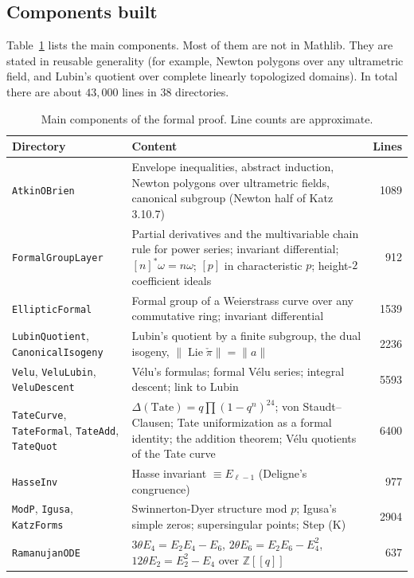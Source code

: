 \documentclass[11pt]{amsart}
\newcommand{\Z}{\mathbb{Z}}
\DeclareMathOperator{\Lie}{Lie}
\newcommand{\lean}[1]{\texttt{#1}}
\theoremstyle{plain}
\theoremstyle{definition}
\numberwithin{equation}{section}
\begin{document}
\subsection{Components built}
Table~\ref{tab:lean} lists the main components. Most of them are not in Mathlib. They are stated in reusable generality
(for example, Newton polygons over any ultrametric field, and Lubin's quotient over complete linearly topologized domains).
In total there are about $43{,}000$ lines in $38$ directories.

\begin{table}[ht]
\centering\small
\caption{Main components of the formal proof. Line counts are approximate.}\label{tab:lean}
\begin{tabular}{@{}p{}p{}r@{}}
\toprule
Directory & Content & Lines\\
\midrule
\lean{AtkinOBrien} & Envelope inequalities, abstract induction, Newton polygons over ultrametric fields, canonical subgroup (Newton half of Katz 3.10.7) & 1089\\
\lean{FormalGroupLayer} & Partial derivatives and the multivariable chain rule for power series; invariant differential; $[n]^*\omega=n\omega$; $[p]$ in characteristic $p$; height-$2$ coefficient ideals & 912\\
\lean{EllipticFormal} & Formal group of a Weierstrass curve over any commutative ring; invariant differential & 1539\\
\lean{LubinQuotient}, \lean{CanonicalIsogeny} & Lubin's quotient by a finite subgroup, the dual isogeny, $\|\Lie\check\pi\|=\|a\|$ & 2236\\
\lean{Velu}, \lean{VeluLubin}, \lean{VeluDescent} & V\'elu's formulas; formal V\'elu series; integral descent; link to Lubin & 5593\\
\lean{TateCurve}, \lean{TateFormal}, \lean{TateAdd}, \lean{TateQuot} & $\Delta(\mathrm{Tate})=q\prod(1-q^n)^{24}$; von Staudt--Clausen; Tate uniformization as a formal identity; the addition theorem; V\'elu quotients of the Tate curve & 6400\\
\lean{HasseInv} & Hasse invariant $\equiv E_{\ell-1}$ (Deligne's congruence) & 977\\
\lean{ModP}, \lean{Igusa}, \lean{KatzForms} & Swinnerton-Dyer structure mod $p$; Igusa's simple zeros; supersingular points; Step (K) & 2904\\
\lean{RamanujanODE} & $3\theta E_4=E_2E_4-E_6$, $2\theta E_6=E_2E_6-E_4^2$, $12\theta E_2=E_2^2-E_4$ over $\Z[[q]]$ & 637\\

\end{tabular}
\end{table}
\end{document}
